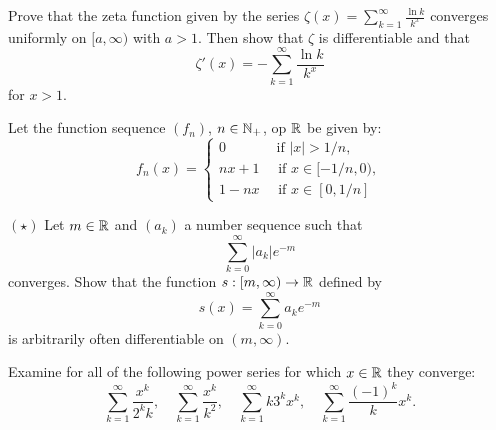 \documentclass[week=12]{homework}
\date{\today}
\begin{document}
    \maketitle
    \thispagestyle{empty}
    \newpage
    \begin{questions}
		\let\firstquestion\question
		\renewcommand*{\question}{\vspace{7mm}\firstquestion}
        \firstquestion
		Prove that the zeta function given by the series $\zeta(x) = \sum_{k=1}^{\infty} \frac{\ln k}{k^x}$ converges uniformly on $[a,\infty)$ with $a > 1$. Then show that $\zeta$ is differentiable and that 
		\[
			\zeta'(x) = - \sum_{k=1}^{\infty} \frac{\ln k}{k^x}
		\]
		for $x > 1$.
		
		\question
		Let the function sequence $(f_n)$, $n \in \mathbb{N}_+$, op $\mathbb{R}$ be given by:
		\[
			f_n(x) = \begin{cases}
				0 		\qquad \quad \; \text{ if } |x| > 1/n, \\
				nx+1 	\quad \text{ if } x \in [-1/n,0), \\
				1 - nx 	\quad \text{ if } x \in [0,1/n]
			\end{cases}
		\]
		
		\question
		$(\star)$ Let $m \in \mathbb{R}$ and $(a_k)$ a number sequence such that 
		\[
			\sum_{k=0}^{\infty} |a_k|e^{-m}
		\]
		converges. Show that the function $s : [m,\infty) \to \mathbb{R}$ defined by 
		\[
			s(x) = \sum_{k=0}^{\infty} a_k e^{-m}
		\] 
		is arbitrarily often differentiable on $(m,\infty)$. 

	     \question
	     Examine for all of the following power series for which $x \in \mathbb{R}$ they converge:
	     \[
	     \sum_{k=1}^{\infty} \frac{x^k}{2^k k}, \quad 
	     \sum_{k=1}^{\infty} \frac{x^k}{k^2}, \quad
	     \sum_{k=1}^{\infty} k 3^k x^k, \quad 
	     \sum_{k=1}^{\infty} \frac{(-1)^k}{k} x^k.
	     \]
     \end{questions}
\end{document}
